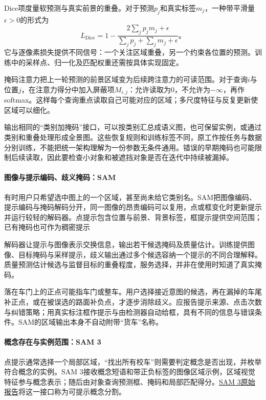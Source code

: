 Dice项度量软预测与真实前景的重叠。对于预测$p_j$和真实标签$m_j$，一种带平滑量$\epsilon>0$的形式为
\begin{equation}
 L_{\mathrm{Dice}}=
 1-\frac{2\sum_j p_jm_j+\epsilon}
 {\sum_j p_j+\sum_j m_j+\epsilon}\text{。}
 \label{eq:vision-dice}
\end{equation}
它与逐像素损失提供不同信号：一个关注区域重叠，另一个约束各位置的预测。训练中的采样点、归一化及匹配权重还需按具体实现固定。

掩码注意力把上一轮预测的前景区域变为后续跨注意力的可读范围。对于查询$i$与位置$j$，在注意力得分中加入屏蔽项$M_{i,j}$：允许读取为0，不允许为$-\infty$，再作softmax。这样每个查询重点读取自己可能对应的区域；多尺度特征与反复更新使区域可以细化。

输出相同的“类别加掩码”接口，可以按类别汇总成语义图，也可保留实例，或通过类别和重叠处理形成全景图。这些恢复规则和训练标签不同，原工作按任务与数据分别训练，不能把统一架构理解为一份参数无条件通用。错误的早期掩码也可能限制后续读取，因此要检查小对象和被遮挡对象是否在迭代中持续被漏掉。

\paragraph{图像与提示编码、歧义掩码：SAM}
\label{sec:vision-recognition-sam}

有时用户只希望选中图上的一个区域，甚至尚未给它类别名。SAM把图像编码、提示编码与掩码解码分开，同一图像的昂贵编码可以复用，点或框变化时更新提示并运行较轻的解码器。点提示包含位置与前景、背景标签，框提示提供空间范围；已有掩码也可作为稠密提示

解码器让提示与图像表示交换信息，输出若干候选掩码及质量估计。训练提供图像、目标掩码与采样提示，歧义输出通过多个候选容纳一个提示的不同合理解释。质量预测估计候选与监督目标的重叠程度，服务选择，并非在使用时知道了真实掩码。

落在车门上的正点可能指车门或整车。用户选择接近意图的候选，再在漏掉的车尾补正点，或在被误选的路面补负点，才逐步消除歧义。应报告提示来源、点击次数与纠错策略；用真实标注框作提示与由检测器自动给框，具有不同的信息与错误条件。SAM的区域输出本身不自动附带“货车”名称。

\paragraph{概念存在与实例范围：SAM 3}
\label{sec:vision-recognition-sam3}

点提示通常选择一个局部区域，“找出所有校车”则需要判定概念是否出现，并枚举符合概念的实例。SAM 3接收概念短语和带正负标签的图像区域示例，区域视觉特征参与概念表示；随后由对象查询预测框、掩码和局部匹配得分。\nocite{vision-2511-16719}\href{https://arxiv.org/abs/2511.16719}{SAM 3原始报告}将这一接口称为可提示概念分割。

